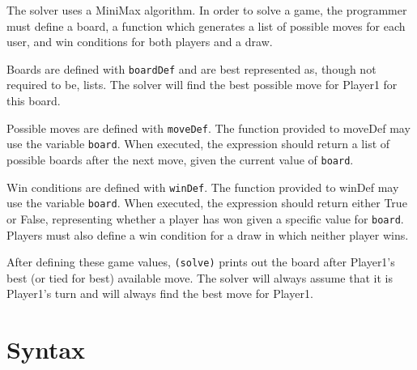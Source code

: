\documentclass{article}
\begin{document}
The solver uses a MiniMax algorithm. In order to solve a game, the programmer must define a board, a function which generates a list of possible moves for each user, and win conditions for both players and a draw.

Boards are defined with \verb|boardDef| and are best represented as, though not required to be, lists. The solver will find the best possible move for Player1 for this board.

Possible moves are defined with \verb|moveDef|. The function provided to moveDef may use the variable \verb|board|. When executed, the expression should return a list of possible boards after the next move, given the current value of \verb|board|.

Win conditions are defined with \verb|winDef|. The function provided to winDef may use the variable \verb|board|. When executed, the expression should return either True or False, representing whether a player has won given a specific value for \verb|board|. Players must also define a win condition for a draw in which neither player wins.

After defining these game values, \verb|(solve)| prints out the board after Player1's best (or tied for best) available move. The solver will always assume that it is Player1's turn and will always find the best move for Player1.


\section{Syntax}
\end{document}
